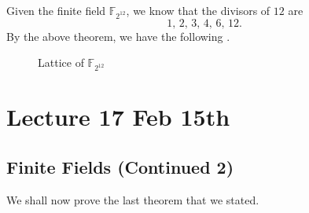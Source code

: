 \documentclass[notoc,notitlepage]{tufte-book}
\begin{document}
\begin{eg}
  Given the finite field $\mathbb{F}_{2^{12}}$, we know that the divisors of $12$ are
  \begin{equation*}
    1, \, 2, \, 3, \, 4, \, 6, \, 12.
  \end{equation*}
  By the above theorem, we have the following . 
  \begin{figure}[ht]
    \centering
    \caption{Lattice of $\mathbb{F}_{2^12}$}
    \label{fig:lattice_of_f__2_12_}
  \end{figure}
\end{eg}




\chapter{Lecture 17 Feb 15th}%
\label{chp:lecture_17_feb_15th}

\section{Finite Fields (Continued 2)}%
\label{sec:finite_fields_continued_2}

We shall now prove the last theorem that we stated.
\end{document}
